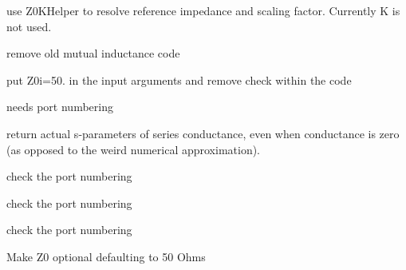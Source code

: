 
\begin{DoxyRefList}
\item[\label{todo__todo000001}%
\Hypertarget{todo__todo000001}%
Member \hyperlink{namespaceSignalIntegrity_1_1Devices_1_1Mutual_afd907d0061f13783b261b76e3dbd45d4}{Signal\+Integrity\+:\+:Devices\+:\+:Mutual.Mutual} (Ll, Lr, M, f, Z0=None, K=None)]use Z0\+K\+Helper to resolve reference impedance and scaling factor. Currently K is not used. 

remove old mutual inductance code  
\item[\label{todo__todo000002}%
\Hypertarget{todo__todo000002}%
Member \hyperlink{namespaceSignalIntegrity_1_1Devices_1_1ReferenceImpedanceTransformer_a9e41bb15210406f67383bb87c8009440}{Signal\+Integrity\+:\+:Devices\+:\+:Reference\+Impedance\+Transformer.Reference\+Impedance\+Transformer} (Z0f, Z0i=None, Kf=None, Ki=None)]put Z0i=50. in the input arguments and remove check within the code 

needs port numbering  
\item[\label{todo__todo000003}%
\Hypertarget{todo__todo000003}%
Member \hyperlink{namespaceSignalIntegrity_1_1Devices_1_1SeriesG_ae20ca521cee3c128cc38dc8cca9e5e62}{Signal\+Integrity\+:\+:Devices\+:\+:SeriesG.SeriesG} (G, Z0=50.)]return actual s-\/parameters of series conductance, even when conductance is zero (as opposed to the weird numerical approximation).  
\item[\label{todo__todo000004}%
\Hypertarget{todo__todo000004}%
Member \hyperlink{namespaceSignalIntegrity_1_1Devices_1_1ShuntDevice_aa029c69b0ed8735ab01138a19ee9f1df}{Signal\+Integrity\+:\+:Devices\+:\+:Shunt\+Device.Shunt\+Device\+Four\+Port} (D)]check the port numbering  
\item[\label{todo__todo000005}%
\Hypertarget{todo__todo000005}%
Member \hyperlink{namespaceSignalIntegrity_1_1Devices_1_1ShuntZ_a071383dcde5ba797b9f5882b739c77ee}{Signal\+Integrity\+:\+:Devices\+:\+:ShuntZ.Shunt\+Z\+Four\+Port} (Z, Z0=50.)]check the port numbering  
\item[\label{todo__todo000006}%
\Hypertarget{todo__todo000006}%
Member \hyperlink{namespaceSignalIntegrity_1_1Devices_1_1ShuntZ_a4f6b7665037fa8b00407684e513e7e37}{Signal\+Integrity\+:\+:Devices\+:\+:ShuntZ.Shunt\+Z\+Three\+Port} (Z, Z0=50.)]check the port numbering  
\item[\label{todo__todo000007}%
\Hypertarget{todo__todo000007}%
Member \hyperlink{namespaceSignalIntegrity_1_1Devices_1_1TLineFourPort_a9068bc032d12fa66cf6a8526f3b6d8ff}{Signal\+Integrity\+:\+:Devices\+:\+:T\+Line\+Four\+Port.T\+Line\+Four\+Port} (Zc, gamma, Z0)]Make Z0 optional defaulting to 50 Ohms 


\end{DoxyRefList}
